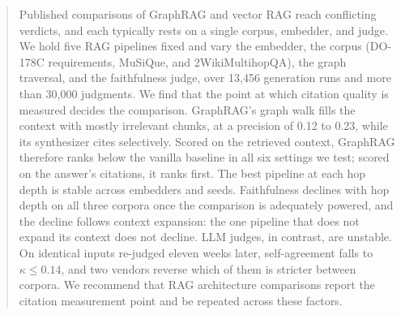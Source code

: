 \begin{abstract}
Published comparisons of GraphRAG and vector RAG reach conflicting
verdicts, and each typically rests on a single corpus, embedder, and
judge. We hold five RAG pipelines fixed and vary the embedder, the
corpus (DO-178C requirements, MuSiQue, and 2WikiMultihopQA), the graph
traversal, and the faithfulness judge, over 13{,}456 generation runs
and more than 30{,}000 judgments. We find that the point at which
citation quality is measured decides the comparison. GraphRAG's graph
walk fills the context with mostly irrelevant chunks, at a precision of
0.12 to 0.23, while its synthesizer cites selectively. Scored on the
retrieved context, GraphRAG therefore ranks below the vanilla baseline
in all six settings we test; scored on the answer's citations, it ranks
first. The best pipeline at each hop depth is stable across embedders
and seeds. Faithfulness declines with hop depth on all three corpora
once the comparison is adequately powered, and the decline follows
context expansion: the one pipeline that does not expand its context
does not decline. LLM judges, in contrast, are unstable. On identical
inputs re-judged eleven weeks later, self-agreement falls to
$\kappa \le 0.14$, and two vendors reverse which of them is stricter
between corpora. We recommend that RAG architecture comparisons report
the citation measurement point and be repeated across these factors.

\end{abstract}

